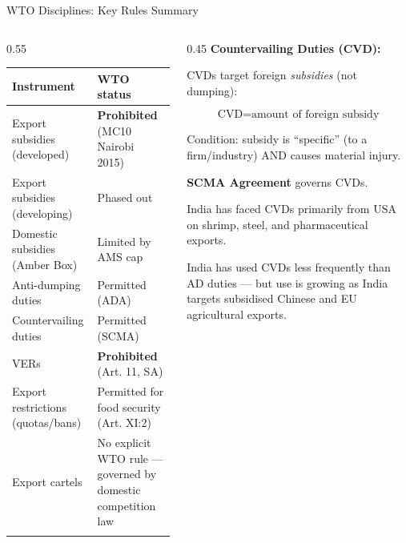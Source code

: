 \documentclass[
  ignorenonframetext,
  aspectratio=169,
]{beamer}
\makeatletter
\let\quarto@originallabel\label
\DeclareRobustCommand*{\label}[1]{\quarto@originallabel{#1}}
\makeatother
\begin{document}
\begin{frame}{WTO Disciplines: Key Rules Summary}
\label{wto-disciplines-key-rules-summary}
\begin{columns}[T]
\begin{column}{0.55\linewidth}
\begin{longtable}[]{@{}
  >{\raggedright\arraybackslash}p{}
  >{\raggedright\arraybackslash}p{}@{}}
\toprule\noalign{}
\begin{minipage}[b]{\linewidth}\raggedright
Instrument
\end{minipage} & \begin{minipage}[b]{\linewidth}\raggedright
WTO status
\end{minipage} \\
\midrule\noalign{}
\endhead
Export subsidies (developed) & \textbf{Prohibited} (MC10 Nairobi
2015) \\
Export subsidies (developing) & Phased out \\
Domestic subsidies (Amber Box) & Limited by AMS cap \\
Anti-dumping duties & Permitted (ADA) \\
Countervailing duties & Permitted (SCMA) \\
VERs & \textbf{Prohibited} (Art. 11, SA) \\
Export restrictions (quotas/bans) & Permitted for food security (Art.
XI:2) \\
Export cartels & No explicit WTO rule --- governed by domestic
competition law \\
\bottomrule\noalign{}
\end{longtable}

\end{column}

\begin{column}{0.45\linewidth}
\textbf{Countervailing Duties (CVD):}

CVDs target foreign \emph{subsidies} (not dumping):

\[\text{CVD} = \text{amount of foreign subsidy}\]

Condition: subsidy is ``specific'' (to a firm/industry) AND causes
material injury.

\textbf{SCMA Agreement} governs CVDs.

India has faced CVDs primarily from USA on shrimp, steel, and
pharmaceutical exports.

India has used CVDs less frequently than AD duties --- but use is
growing as India targets subsidised Chinese and EU agricultural exports.
\end{column}
\end{columns}
\end{frame}
\end{document}
